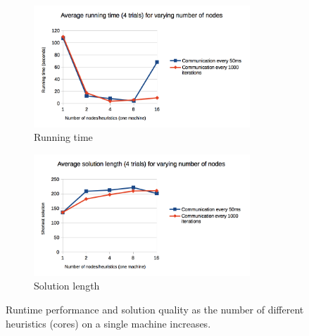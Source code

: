 \documentclass{article}
\begin{document}
\begin{figure}
\centering
\begin{subfigure}{3.2in}
  \includegraphics[width=3.2in]{graphs/numcores_runningtime}
  \caption{Running time}
  \label{fig:numcores_runtime}
\end{subfigure}
\begin{subfigure}{3.2in}
  \includegraphics[width=3.2in]{graphs/numcores_solutionquality}
  \caption{Solution length}
  \label{fig:numcores_solnqual}
\end{subfigure}
\caption{Runtime performance and solution quality as the number of different heuristics (cores) on a single machine increases.}
\label{fig:numcores}
\end{figure}
\end{document}
